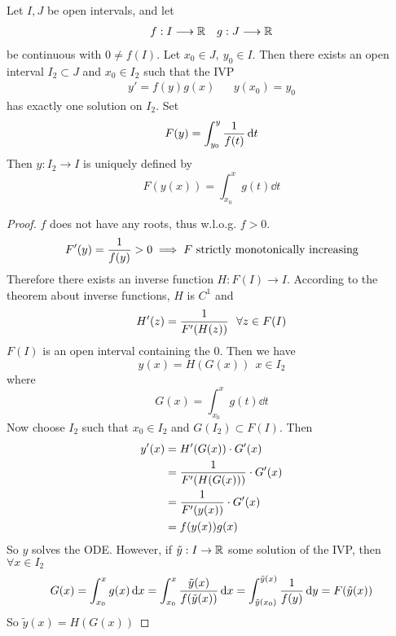 \documentclass[../../script.tex]{subfiles}
\begin{document}
\begin{thm}
    Let $I, J$ be open intervals, and let 
    \begin{align*}
        f: I \longrightarrow \mathbb{R} && g: J \longrightarrow \mathbb{R} 
    \end{align*}
    be continuous with $0 \ne f(I)$. Let $x_0 \in J, ~y_0 \in I$.
    Then there exists an open interval $I_2 \subset J$ and $x_0 \in I_2$ such that the IVP
    \begin{align*}
        y' = f(y)g(x) && y(x_0) = y_0
    \end{align*}
    has exactly one solution on $I_2$. Set 
    \[
        F(y) = \int_{y_0}^y \frac{1}{f(t)} \dd{t}
    \]
    Then $y: I_2 \rightarrow I$ is uniquely defined by 
    \[
        F(y(x)) = \int_{x_0}^x g(t) \dd{t}
    \]
\end{thm}
\begin{proof}
    $f$ does not have any roots, thus w.l.o.g. $f > 0$.
    \begin{equation}
        F'(y) = \frac{1}{f(y)} > 0 \implies F \text{ strictly monotonically increasing}
    \end{equation}
    Therefore there exists an inverse function $H: F(I) \rightarrow I$. According to the theorem about inverse functions, $H$ is $C^1$ and 
    \begin{equation}
        H'(z) = \frac{1}{F'(H(z))} ~~\forall z \in F(I)
    \end{equation}
    $F(I)$ is an open interval containing the $0$. Then we have 
    \begin{equation}
        y(x) = H(G(x)) ~~x \in I_2
    \end{equation}
    where 
    \begin{equation}
        G(x) = \int_{x_0}^x g(t) \dd{t}
    \end{equation}
    Now choose $I_2$ such that $x_0 \in I_2$ and $G(I_2) \subset F(I)$. Then 
    \begin{equation}
        \begin{split}
            y'(x) &= H'(G(x)) \cdot G'(x) \\
            &= \frac{1}{F'(H(G(x)))} \cdot G'(x) \\
            &= \frac{1}{F'(y(x))} \cdot G'(x) \\
            &= f(y(x)) g(x)
        \end{split}
    \end{equation}
    So $y$ solves the ODE. However, if $\tilde{y}: I \rightarrow \mathbb{R}$ some solution of the IVP, then $\forall x \in I_2$
    \begin{equation}
        \begin{split}
            G(x) = \int_{x_0}^x g(x) \dd{x} = \int_{x_0}^x \frac{\tilde{y}(x)}{f(\tilde{y}(x))} \dd{x} = \int_{\tilde{y}(x_0)}^{\tilde{y}(x)} \frac{1}{f(y)} \dd{y} = F(\tilde{y}(x))
        \end{split}
    \end{equation}
    So $\tilde{y}(x) = H(G(x))$
\end{proof}
\end{document}

